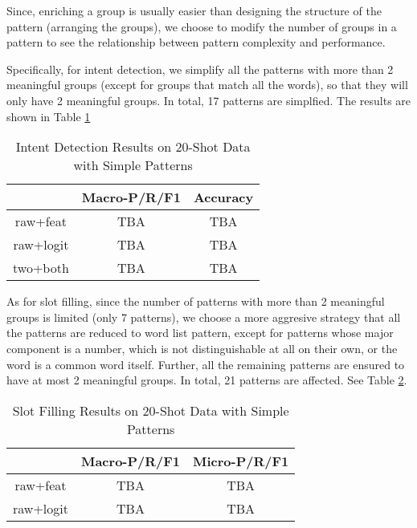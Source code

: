 Since, enriching a group is usually easier than designing the structure of the pattern (arranging the groups), we choose to modify the number of groups in a pattern to see the relationship between pattern complexity and performance.

Specifically, for intent detection, we simplify all the patterns with more than 2 meaningful groups (except for groups that match all the words), so that they will only have 2 meaningful groups. In total, 17 patterns are simplfied. The results are shown in Table \ref{simple_intent}

\begin{table}
\setlength{\tabcolsep}{0.23em}
\centering
\small{
\begin{tabular}{|c|c|c|}

\hline
  & Macro-P/R/F1 & Accuracy  \\
\hline
raw+feat & TBA & TBA  \\
\hline
raw+logit & TBA & TBA  \\
\hline
two+both & TBA & TBA \\
\hline 
\end{tabular}
}
\caption{Intent Detection Results on 20-Shot Data with Simple Patterns}
\label{simple_intent}
\end{table}


As for slot filling, since the number of patterns with more than 2 meaningful groups is limited (only 7 patterns), we choose a more aggresive strategy that all the patterns are reduced to word list pattern, except for patterns whose major component is a number, which is not distinguishable at all on their own, or the word is a common word itself. Further, all the remaining patterns are ensured to have at most 2 meaningful groups. In total, 21 patterns are affected. See Table \ref{simple_slot}.

\begin{table}
\setlength{\tabcolsep}{0.23em}
\centering
\small{
\begin{tabular}{|c|c|c|}

\hline
  & Macro-P/R/F1 & Micro-P/R/F1  \\
\hline
raw+feat & TBA & TBA  \\
\hline
raw+logit & TBA & TBA  \\
\hline 
\end{tabular}
}
\caption{Slot Filling Results on 20-Shot Data with Simple Patterns}
\label{simple_slot}
\end{table}




